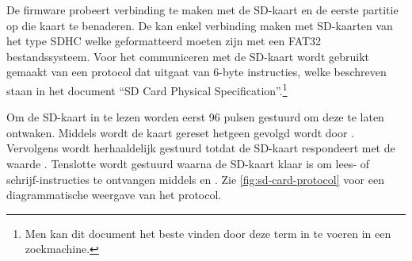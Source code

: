 De firmware probeert verbinding te maken met de SD-kaart en de eerste partitie op die kaart te benaderen. De \product kan enkel verbinding maken met SD-kaarten van het type SDHC welke geformatteerd moeten zijn met een FAT32 bestandssysteem. Voor het communiceren met de SD-kaart wordt gebruikt gemaakt van een protocol dat uitgaat van 6-byte instructies, welke beschreven staan in het document ``SD Card Physical Specification''.\footnote{Men kan dit document het beste vinden door deze term in te voeren in een zoekmachine.}

Om de SD-kaart in te lezen worden eerst 96 pulsen gestuurd om deze te laten ontwaken. Middels  wordt de kaart gereset hetgeen gevolgd wordt door . Vervolgens wordt herhaaldelijk  gestuurd totdat de SD-kaart respondeert met de waarde . Tenslotte wordt  gestuurd waarna de SD-kaart klaar is om lees- of schrijf-instructies te ontvangen middels  en . Zie \cref{fig:sd-card-protocol} voor een diagrammatische weergave van het protocol.

